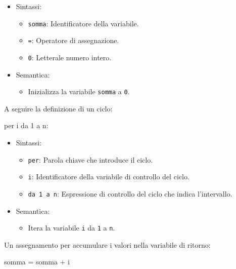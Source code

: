 \documentclass[
  letterpaper,
  DIV=11,
  numbers=noendperiod]{scrreprt}
\newenvironment{Shaded}{\begin{snugshade}}{\end{snugshade}}
\newcommand{\NormalTok}[1]{\textcolor[rgb]{0.00,0.23,0.31}{#1}}
\providecommand{\tightlist}{%
  \setlength{\itemsep}{0pt}\setlength{\parskip}{0pt}}\usepackage{longtable,booktabs,array}
\begin{document}
\begin{itemize}
\tightlist
\item
  Sintassi:

  \begin{itemize}
  \tightlist
  \item
    \texttt{somma}: Identificatore della variabile.
  \item
    \texttt{=}: Operatore di assegnazione.
  \item
    \texttt{0}: Letterale numero intero.
  \end{itemize}
\item
  Semantica:

  \begin{itemize}
  \tightlist
  \item
    Inizializza la variabile \texttt{somma} a \texttt{0}.
  \end{itemize}
\end{itemize}

A seguire la definizione di un ciclo:

\begin{Shaded}
\begin{Highlighting}[]
\NormalTok{per i da 1 a n:}
\end{Highlighting}
\end{Shaded}

\begin{itemize}
\tightlist
\item
  Sintassi:

  \begin{itemize}
  \tightlist
  \item
    \texttt{per}: Parola chiave che introduce il ciclo.
  \item
    \texttt{i}: Identificatore della variabile di controllo del ciclo.
  \item
    \texttt{da\ 1\ a\ n}: Espressione di controllo del ciclo che indica
    l'intervallo.
  \end{itemize}
\item
  Semantica:

  \begin{itemize}
  \tightlist
  \item
    Itera la variabile \texttt{i} da \texttt{1} a \texttt{n}.
  \end{itemize}
\end{itemize}

Un assegnamento per accumulare i valori nella variabile di ritorno:

\begin{Shaded}
\begin{Highlighting}[]
\NormalTok{somma = somma + i}
\end{Highlighting}
\end{Shaded}
\end{document}
